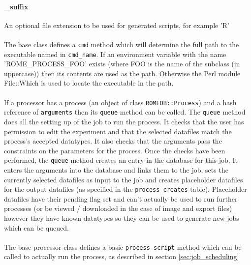 \paragraph{\_suffix}
An optional file extension to be used for generated scripts, for example 'R'

\paragraph{}
The base class defines a \texttt{cmd} method which will determine the full path to the executable named in \texttt{cmd\_name}. If an environment variable with the name 'ROME\_PROCESS\_FOO' exists (where FOO is the name of the subclass (in uppercase)) then its contents are used as the path. Otherwise the Perl module File::Which is used to locate the executable in the path. 

\paragraph{}
If a processor has a process (an object of class \texttt{ROMEDB::Process}) and a hash reference of \texttt{arguments} then its \texttt{queue} method can be called. The \texttt{queue} method does all the setting up of the job to run the process. It checks that the user has permission to edit the experiment and that the selected datafiles match the process's accepted datatypes. It also checks that the arguments pass the constraints on the parameters for the process. Once the checks have been performed, the \texttt{queue} method creates an entry in the database for this job. It enters the arguments into the database and links them to the job, sets the currently selected datafiles as input to the job and creates placeholder datafiles for the output datafiles (as specified in the \texttt{process\_creates} table). Placeholder datafiles have their pending flag set and can't actually be used to run further processes (or be viewed / downloaded in the case of image and export files) however they have known datatypes so they can be used to generate new jobs which can be queued.


\paragraph{}
The base processor class defines a basic \texttt{process\_script} method which can be called to actually run the process, as described in section \ref{sec:job_scheduling}

